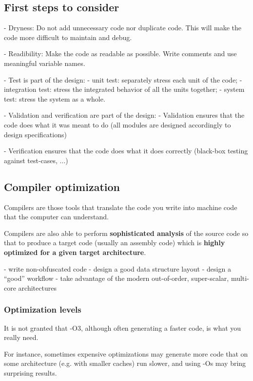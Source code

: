 \subsection{First steps to consider}

- Dryness: Do not add unnecessary code nor duplicate code. This will make the code more difficult to maintain and debug.

- Readibility: Make the code as readable as possible. Write comments and use meaningful variable names.

- Test is part of the design:
    - unit test: separately stress each unit of the code;
    - integration test: stress the integrated behavior of all the units together;
    - system test: stress the system as a whole.

- Validation and verification are part of the design:
    - Validation ensures that the code does what it was meant to do (all modules are designed accordingly to design specifications)

    - Verification ensures that the code does what it does correctly (black-box testing against test-cases, ...)

\subsection{Compiler optimization}

Compilers are those tools that translate the code you write into machine code that the computer can understand. 

Compilers are also able to perform \textbf{sophisticated analysis} of the source code so that to produce a target code (usually an assembly code) which is \textbf{highly optimized for a given target architecture}.

- write non-obfuscated code
- design a good data structure layout
- design a “good” workflow
- take advantage of the modern out-of-order, super-scalar, multi-core architectures

\subsubsection{Optimization levels}

It is not granted that -O3, although often generating a faster code, is what you really need.

For instance, sometimes expensive optimizations may generate more code that on some architecture (e.g. with smaller caches) run slower, and using -Os may bring surprising results.

